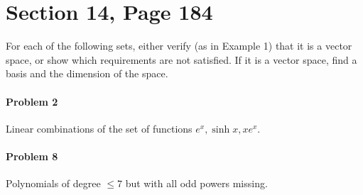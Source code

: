\documentclass{article}
\begin{document}
\section*{Section 14, Page 184}

For each of the following sets, either verify (as in Example 1) that it is a vector space,
or show which requirements are not satisfied. If it is a vector space, find a basis and the
dimension of the space.

\paragraph{Problem 2}
Linear combinations of the set of functions ${e^x, \sinh x, xe^x}$.

\paragraph{Problem 8}
Polynomials of degree $\leq 7$ but with all odd powers missing.
\end{document}
